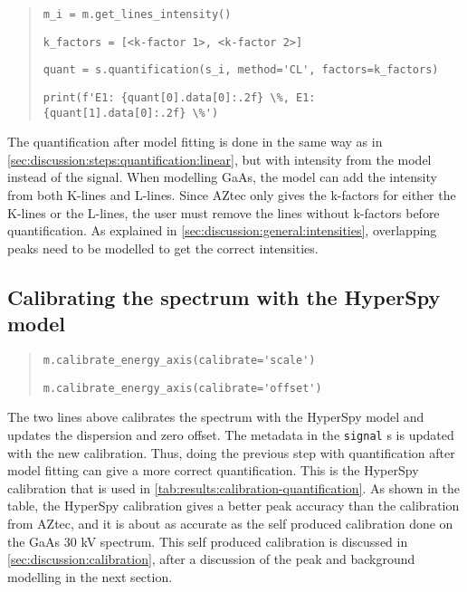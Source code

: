 \begin{quote}
    \verb|m_i = m.get_lines_intensity()|

    \verb|k_factors = [<k-factor 1>, <k-factor 2>] |

    \verb|quant = s.quantification(s_i, method='CL', factors=k_factors)|

    \verb|print(f'E1: {quant[0].data[0]:.2f} \%, E1: {quant[1].data[0]:.2f} \%')|

\end{quote}

The quantification after model fitting is done in the same way as in \cref{sec:discussion:steps:quantification:linear}, but with intensity from the model instead of the signal.
When modelling GaAs, the model can add the intensity from both K-lines and L-lines.
Since AZtec only gives the k-factors for either the K-lines or the L-lines, the user must remove the lines without k-factors before quantification.
As explained in \cref{sec:discussion:general:intensities}, overlapping peaks need to be modelled to get the correct intensities.






\subsection{Calibrating the spectrum with the HyperSpy model}
\label{sec:discussion:steps:HyperSpycalibration}

\begin{quote}

    \verb|m.calibrate_energy_axis(calibrate='scale')|

    \verb|m.calibrate_energy_axis(calibrate='offset')|

\end{quote}

The two lines above calibrates the spectrum with the HyperSpy model and updates the dispersion and zero offset.
The metadata in the \verb|signal| s is updated with the new calibration.
Thus, doing the previous step with quantification after model fitting can give a more correct quantification.
This is the HyperSpy calibration that is used in \cref{tab:results:calibration-quantification}.
As shown in the table, the HyperSpy calibration gives a better peak accuracy than the calibration from AZtec, and it is about as accurate as the self produced calibration done on the GaAs 30 kV spectrum.
This self produced calibration is discussed in \cref{sec:discussion:calibration}, after a discussion of the peak and background modelling in the next section.












